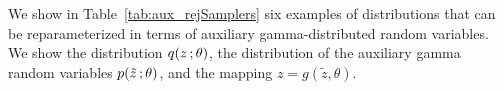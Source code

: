 We show in Table~\ref{tab:aux_rejSamplers} six examples of distributions that can be reparameterized in terms of auxiliary gamma-distributed random variables. We show the distribution $q(z\, ;\theta)$, the distribution of the auxiliary gamma random variables $p(\tilde{z}\, ;\theta)$, and the mapping $z=g(\tilde{z},\theta)$.



